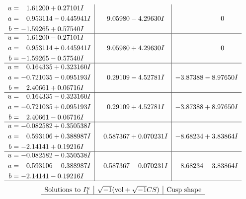 \documentclass[1p]{elsarticle_modified}
\theoremstyle{definition}
\newcommand{\I}{\sqrt{-1}}
\begin{document}
$$\begin{array}{c|c|c}
\begin{aligned}
u &= \phantom{-}1.61200 + 0.27101 I \\
a &= \phantom{-}0.953114 - 0.445941 I \\
b &= -1.59265 + 0.57540 I\end{aligned}
 & \phantom{-}9.05980 - 4.29630 I & \phantom{-0.000000 } 0 \\ \hline\begin{aligned}
u &= \phantom{-}1.61200 - 0.27101 I \\
a &= \phantom{-}0.953114 + 0.445941 I \\
b &= -1.59265 - 0.57540 I\end{aligned}
 & \phantom{-}9.05980 + 4.29630 I & \phantom{-0.000000 } 0 \\ \hline\begin{aligned}
u &= \phantom{-}0.164335 + 0.323160 I \\
a &= -0.721035 - 0.095193 I \\
b &= \phantom{-}2.40661 + 0.06716 I\end{aligned}
 & \phantom{-}0.29109 - 4.52781 I & -3.87388 - 8.97650 I \\ \hline\begin{aligned}
u &= \phantom{-}0.164335 - 0.323160 I \\
a &= -0.721035 + 0.095193 I \\
b &= \phantom{-}2.40661 - 0.06716 I\end{aligned}
 & \phantom{-}0.29109 + 4.52781 I & -3.87388 + 8.97650 I \\ \hline\begin{aligned}
u &= -0.082582 + 0.350538 I \\
a &= \phantom{-}0.593106 + 0.388987 I \\
b &= -2.14141 + 0.19216 I\end{aligned}
 & \phantom{-}0.587367 + 0.070231 I & -8.68234 + 3.83864 I \\ \hline\begin{aligned}
u &= -0.082582 - 0.350538 I \\
a &= \phantom{-}0.593106 - 0.388987 I \\
b &= -2.14141 - 0.19216 I\end{aligned}
 & \phantom{-}0.587367 - 0.070231 I & -8.68234 - 3.83864 I\\
 \hline 
 \end{array}$$\newpage$$\begin{array}{c|c|c}  
\text{Solutions to }I^u_{1}& \I (\text{vol} + \sqrt{-1}CS) & \text{Cusp shape}\\
 \hline 

\end{array}$$
\end{document}
